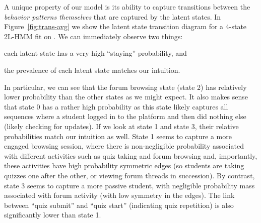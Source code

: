 A unique property of our model is its ability to capture transitions
between the \emph{behavior patterns themselves} that are captured by the
latent states. In Figure~\ref{fig:trans-avg} we show the latent state
transition diagram for a 4-state 2L-HMM fit on \textretrieval{}. We can
immediately observe two things: \begin{enumerate*}[label=(\arabic*)]
  \item each latent state has a very high ``staying'' probability, and
  \item the prevalence of each latent state matches our intuition.
\end{enumerate*}
In particular, we can see that the forum browsing state (state 2) has
relatively lower probability than the other states as we might expect. It
also makes sense that state 0 has a rather high probability as this state
likely captures all sequences where a student logged in to the platform and
then did nothing else (likely checking for updates). If we look at state 1
and state 3, their relative probabilities match our intuition as
well. State 1 seems to capture a more engaged browsing session, where there
is non-negligible probability associated with different activities such as
quiz taking and forum browsing and, importantly, these activities have high
probability symmetric edges (so students are taking quizzes one after the
other, or viewing forum threads in succession). By contrast, state 3 seems
to capture a more passive student, with negligible probability mass
associated with forum activity (with low symmetry in the edges). The link
between ``quiz submit'' and ``quiz start'' (indicating quiz repetition) is
also significantly lower than state 1.

